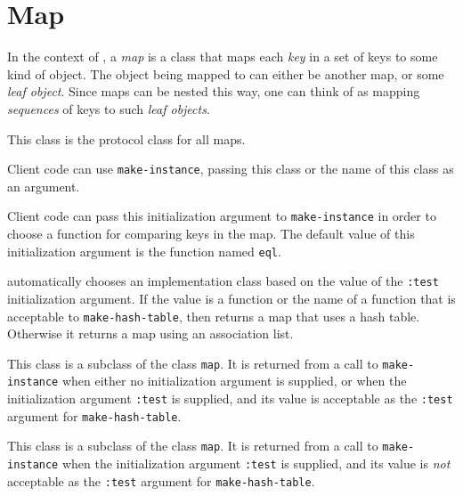 \chapter{Map}

In the context of \sysname{}, a \emph{map} is a class that maps
each \emph{key} in a set of keys to some kind of object.  The object
being mapped to can either be another map, or some \emph{leaf
  object}.  Since maps can be nested this way, one can think of
\sysname{} as mapping \emph{sequences} of keys to such \emph{leaf
  objects}.


This class is the protocol class for all maps.

Client code can use \texttt{make-instance}, passing this class or the
name of this class as an argument.


Client code can pass this initialization argument to
\texttt{make-instance} in order to choose a function for comparing
keys in the map.  The default value of this initialization argument is
the function named \texttt{eql}.

\sysname{} automatically chooses an implementation class based on the
value of the \texttt{:test} initialization argument.  If the value is
a function or the name of a function that is acceptable to
\texttt{make-hash-table}, then \sysname{} returns a map that uses a
hash table.  Otherwise it returns a map using an association list.


This class is a subclass of the class \texttt{map}.  It is returned
from a call to \texttt{make-instance} when either no initialization
argument is supplied, or when the initialization argument
\texttt{:test} is supplied, and its value is acceptable as the
\texttt{:test} argument for \texttt{make-hash-table}.


This class is a subclass of the class \texttt{map}.  It is returned
from a call to \texttt{make-instance} when the initialization argument
\texttt{:test} is supplied, and its value is \emph{not} acceptable as
the \texttt{:test} argument for \texttt{make-hash-table}.

